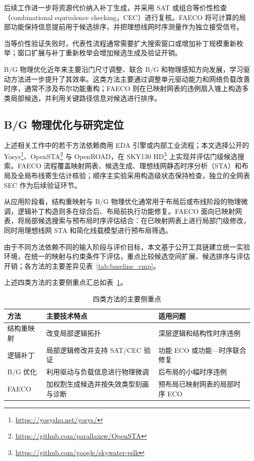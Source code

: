 \documentclass[twocolumn,10pt,fontset=windows]{ctexart}
\begin{document}
后续工作进一步将资源代价纳入补丁生成，并采用 SAT 或组合等价性检查（combinational equivalence checking，CEC）进行复核\cite{jiang2016resource,zhong2024stp}。FAECO 将可计算的局部功能保持信息提前用于候选排序，并把理想线网时序测量作为独立接受信号。

当等价性验证失败时，代表性流程通常需要扩大搜索窗口或增加补丁规模重新枚举\cite{zhuo2018patch}；窗口扩展与补丁重新枚举会增加候选生成及验证开销。

B/G 物理优化近年来主要沿门尺寸调整、联合 B/G 和物理感知方向发展\cite{liu2021rlsizer,huang2025phys,chen2024aito,zhang2025buffalo}，学习驱动方法\cite{chen2024aito,zhang2025buffalo}进一步提升了其效率。这类方法主要通过调整单元驱动能力和网络负载改善时序，通常不涉及布尔功能重构；FAECO 则在已映射网表的违例扇入锥上构造多类局部候选，并利用关键路径信息对候选进行排序。

\subsection{B/G 物理优化与研究定位}
上述相关工作中的若干方法依赖商用 EDA 引擎或内部工业流程；本文选择公开的 Yosys\footnote{\url{https://yosyshq.net/yosys/}}、OpenSTA\footnote{\url{https://github.com/parallaxsw/OpenSTA}} 与 OpenROAD\cite{openroad}，在 SKY130 HD\footnote{\url{https://github.com/google/skywater-pdk}} 上实现并评估门级候选搜索。FAECO 流程覆盖映射网表、候选生成、理想线网静态时序分析（STA）和布局及全局布线寄生估计核验；顺序主实验采用构造级状态保持检查，独立的全网表 SEC 作为后续验证环节。

从应用阶段看，结构重映射与 B/G 物理优化通常用于布局后或布线阶段的物理微调，逻辑补丁构造则多在综合后、布局前执行功能修复。FAECO 面向已映射网表，将局部候选搜索与预布局时序评估结合：在已映射网表上进行局部门级修改，同时用理想线网 STA 和简化线载模型进行预布局筛选。

由于不同方法依赖不同的输入阶段与评价目标，本文基于公开工具链建立统一实验环境，在统一的映射与约束条件下评估，重点比较候选空间扩展、候选排序与评估开销；各方法的主要差异见表~\ref{tab:baseline_cmp}。

上述四类方法的主要侧重点汇总如表~\ref{tab:related_diff}。

\begin{table}[H]
\centering
\caption{四类方法的主要侧重点}
\label{tab:related_diff}
\footnotesize
\setlength{\tabcolsep}{2pt}
\begin{tabular}{>{\raggedright\arraybackslash}p{1.55cm}>{\raggedright\arraybackslash}p{2.55cm}>{\raggedright\arraybackslash}p{3.2cm}}
\toprule
\textbf{方法} & \textbf{主要技术特点} & \textbf{适用问题} \\
\midrule
结构重映射 & 改变局部逻辑拓扑 & 深层逻辑和结构性时序违例 \\
逻辑补丁 & 局部逻辑修改并支持 SAT/CEC 验证 & 功能 ECO 或功能—时序联合修复 \\
B/G 优化 & 利用驱动与负载信息进行物理微调 & 后布局的小幅时序违例 \\
FAECO & 加权割生成候选并按失效类型刻画与诊断 & 预布局已映射网表的局部时序 ECO \\
\bottomrule
\end{tabular}
\end{table}
\end{document}
